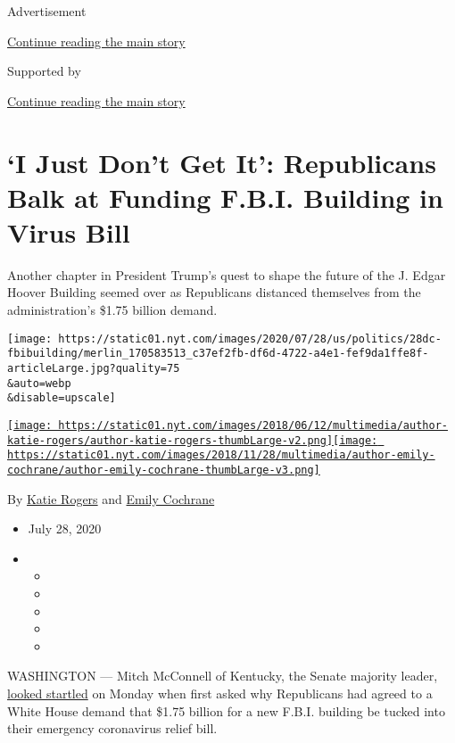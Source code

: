 Advertisement

\protect\hyperlink{after-top}{Continue reading the main story}

Supported by

\protect\hyperlink{after-sponsor}{Continue reading the main story}

\hypertarget{i-just-dont-get-it-republicans-balk-at-funding-fbi-building-in-virus-bill}{%
\section{`I Just Don't Get It': Republicans Balk at Funding F.B.I.
Building in Virus
Bill}\label{i-just-dont-get-it-republicans-balk-at-funding-fbi-building-in-virus-bill}}

Another chapter in President Trump's quest to shape the future of the J.
Edgar Hoover Building seemed over as Republicans distanced themselves
from the administration's \$1.75 billion demand.

\texttt{[image: https://static01.nyt.com/images/2020/07/28/us/politics/28dc-fbibuilding/merlin\_170583513\_c37ef2fb-df6d-4722-a4e1-fef9da1ffe8f-articleLarge.jpg?quality=75\\\&auto=webp\\\&disable=upscale]}

\href{https://www.nytimes.com/by/katie-rogers}{\texttt{[image: https://static01.nyt.com/images/2018/06/12/multimedia/author-katie-rogers/author-katie-rogers-thumbLarge-v2.png]}}\href{https://www.nytimes.com/by/emily-cochrane}{\texttt{[image: https://static01.nyt.com/images/2018/11/28/multimedia/author-emily-cochrane/author-emily-cochrane-thumbLarge-v3.png]}}

By \href{https://www.nytimes.com/by/katie-rogers}{Katie Rogers} and
\href{https://www.nytimes.com/by/emily-cochrane}{Emily Cochrane}

\begin{itemize}
\item
  July 28, 2020
\item
  \begin{itemize}
  \item
  \item
  \item
  \item
  \item
  \end{itemize}
\end{itemize}

WASHINGTON --- Mitch McConnell of Kentucky, the Senate majority leader,
\href{https://twitter.com/NBCNews/status/1288150687109599232?s=20}{looked
startled} on Monday when first asked why Republicans had agreed to a
White House demand that \$1.75 billion for a new F.B.I. building be
tucked into their emergency coronavirus relief bill.

